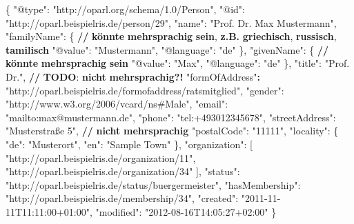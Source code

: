 \documentclass[,a4paper]{article}
\newenvironment{Shaded}{}{}
\newcommand{\DataTypeTok}[1]{\textcolor[rgb]{0.56,0.13,0.00}{{#1}}}
\newcommand{\StringTok}[1]{\textcolor[rgb]{0.25,0.44,0.63}{{#1}}}
\newcommand{\ErrorTok}[1]{\textcolor[rgb]{1.00,0.00,0.00}{\textbf{{#1}}}}
\newcommand{\NormalTok}[1]{{#1}}
\begin{document}
\begin{Shaded}
\begin{Highlighting}[]
\NormalTok{\{}
    \DataTypeTok{"@type"}\NormalTok{: }\StringTok{"http://oparl.org/schema/1.0/Person"}\NormalTok{,}
    \DataTypeTok{"@id"}\NormalTok{: }\StringTok{"http://oparl.beispielris.de/person/29"}\NormalTok{,}
    \DataTypeTok{"name"}\NormalTok{: }\StringTok{"Prof. Dr. Max Mustermann"}\NormalTok{,}
    \DataTypeTok{"familyName"}\NormalTok{: \{ }\ErrorTok{//} \ErrorTok{könnte} \ErrorTok{mehrsprachig} \ErrorTok{sein}\NormalTok{, }\ErrorTok{z.B.} \ErrorTok{griechisch}\NormalTok{, }\ErrorTok{russisch}\NormalTok{, }\ErrorTok{tamilisch} 
        \DataTypeTok{"@value"}\NormalTok{: }\StringTok{"Mustermann"}\NormalTok{,}
        \DataTypeTok{"@language"}\NormalTok{: }\StringTok{"de"}
    \NormalTok{\},}
    \DataTypeTok{"givenName"}\NormalTok{: \{ }\ErrorTok{//} \ErrorTok{könnte} \ErrorTok{mehrsprachig} \ErrorTok{sein}
        \DataTypeTok{"@value"}\NormalTok{: }\StringTok{"Max"}\NormalTok{,}
        \DataTypeTok{"@language"}\NormalTok{: }\StringTok{"de"}
    \NormalTok{\},}
    \DataTypeTok{"title"}\NormalTok{: }\StringTok{"Prof. Dr."}\NormalTok{, }\ErrorTok{//} \ErrorTok{TODO}\NormalTok{: }\ErrorTok{nicht} \ErrorTok{mehrsprachig?!}
    \StringTok{"formOfAddress"}\ErrorTok{:} \StringTok{"http://oparl.beispielris.de/formofaddress/ratsmitglied"}\NormalTok{,}
    \DataTypeTok{"gender"}\NormalTok{: }\StringTok{"http://www.w3.org/2006/vcard/ns#Male"}\NormalTok{,}
    \DataTypeTok{"email"}\NormalTok{: }\StringTok{"mailto:max@mustermann.de"}\NormalTok{,}
    \DataTypeTok{"phone"}\NormalTok{: }\StringTok{"tel:+493012345678"}\NormalTok{,}
    \DataTypeTok{"streetAddress"}\NormalTok{: }\StringTok{"Musterstraße 5"}\NormalTok{, }\ErrorTok{//} \ErrorTok{nicht} \ErrorTok{mehrsprachig}
    \DataTypeTok{"postalCode"}\NormalTok{: }\StringTok{"11111"}\NormalTok{,}
    \DataTypeTok{"locality"}\NormalTok{: \{}
        \DataTypeTok{"de"}\NormalTok{: }\StringTok{"Musterort"}\NormalTok{,}
        \DataTypeTok{"en"}\NormalTok{: }\StringTok{"Sample Town"}
    \NormalTok{\},}
    \DataTypeTok{"organization"}\NormalTok{: [}
        \StringTok{"http://oparl.beispielris.de/organization/11"}\NormalTok{,}
        \StringTok{"http://oparl.beispielris.de/organization/34"}
    \NormalTok{],}
    \DataTypeTok{"status"}\NormalTok{: }\StringTok{"http://oparl.beispielris.de/status/buergermeister"}\NormalTok{,}
    \DataTypeTok{"hasMembership"}\NormalTok{: }\StringTok{"http://oparl.beispielris.de/membership/34"}\NormalTok{,}
    \DataTypeTok{"created"}\NormalTok{: }\StringTok{"2011-11-11T11:11:00+01:00"}\NormalTok{,}
    \DataTypeTok{"modified"}\NormalTok{: }\StringTok{"2012-08-16T14:05:27+02:00"}
\NormalTok{\}}
\end{Highlighting}
\end{Shaded}
\end{document}

